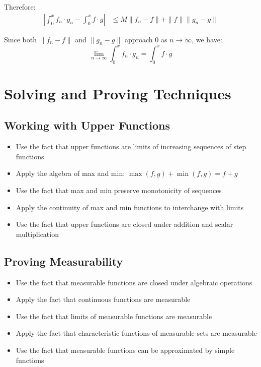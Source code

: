 Therefore:
\begin{align*}
\left|\int_0^x f_n \cdot g_n - \int_0^x f \cdot g\right| &\leq M \| f_n - f \| + \| f \| \| g_n - g \|
\end{align*}

Since both $\| f_n - f \|$ and $\| g_n - g \|$ approach 0 as $n \to \infty$, we have:
\[\lim_{n \to \infty} \int_0^x f_n \cdot g_n = \int_0^x f \cdot g\]

\section{Solving and Proving Techniques}

\subsection*{Working with Upper Functions}
\begin{itemize}
\item Use the fact that upper functions are limits of increasing sequences of step functions
\item Apply the algebra of max and min: $\max(f,g) + \min(f,g) = f + g$
\item Use the fact that max and min preserve monotonicity of sequences
\item Apply the continuity of max and min functions to interchange with limits
\item Use the fact that upper functions are closed under addition and scalar multiplication
\end{itemize}

\subsection*{Proving Measurability}
\begin{itemize}
\item Use the fact that measurable functions are closed under algebraic operations
\item Apply the fact that continuous functions are measurable
\item Use the fact that limits of measurable functions are measurable
\item Apply the fact that characteristic functions of measurable sets are measurable
\item Use the fact that measurable functions can be approximated by simple functions
\end{itemize}

